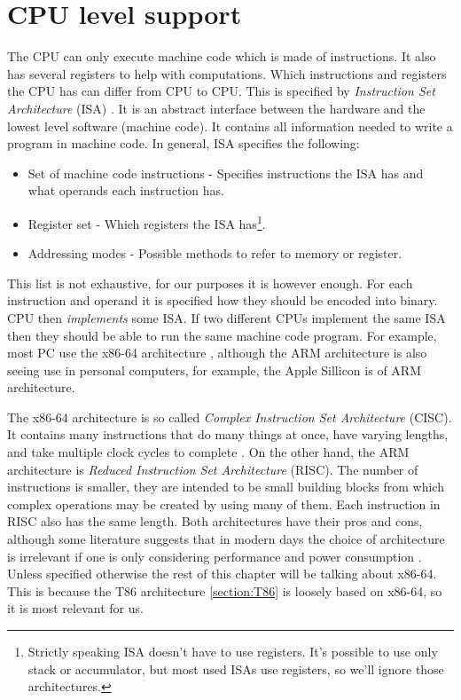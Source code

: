 \section{CPU level support}\label{section:cpu-debug-support}
The CPU can only execute machine code which is made of instructions. It also
has several registers to help with computations. Which instructions and
registers the CPU has can differ from CPU to CPU. This is specified by
\textit{Instruction Set Architecture} (ISA) \cite{aps-isa}. It is an abstract
interface between the hardware and the lowest level software (machine code). It
contains all information needed to write a program in machine code. In general,
ISA specifies the following: 
\begin{itemize}
    \item Set of machine code instructions - Specifies instructions the ISA has
        and what operands each instruction has.
    \item Register set - Which registers the ISA has\footnote{Strictly speaking
        ISA doesn't have to use registers. It's possible to use only stack or
        accumulator, but most used ISAs use registers, so we'll ignore those
        architectures. }.   
    \item Addressing modes - Possible methods to refer to memory or register. 
\end{itemize}
This list is not exhaustive, for our purposes it is however enough. For each
instruction and operand it is specified how they should be encoded into binary.
CPU then \textit{implements} some ISA. If two different CPUs implement the same
ISA then they should be able to run the same machine code program. For example,
most PC use the x86-64 architecture \cite{aps-isa}, although the ARM
architecture is also seeing use in personal computers, for example, the Apple
Sillicon is of ARM architecture.

The x86-64 architecture is so called \textit{Complex Instruction Set Architecture}
(CISC). It contains many instructions that do many things at once, have varying
lengths, and take multiple clock cycles to complete \cite{intel-manual}. On the
other hand, the ARM architecture is \textit{Reduced Instruction Set
Architecture} (RISC). The number of instructions is smaller, they are intended
to be small building blocks from which complex operations may be created by
using many of them. Each instruction in RISC also has the same length. Both
architectures have their pros and cons, although some literature suggests that
in modern days the choice of architecture is irrelevant if one is only
considering performance and power consumption \cite{riscvscisc1, riscvscisc2}.
Unless specified otherwise the rest of this chapter will be talking about x86-64.
This is because the T86 architecture \ref{section:T86} is loosely based on
x86-64, so it is most relevant for us.

